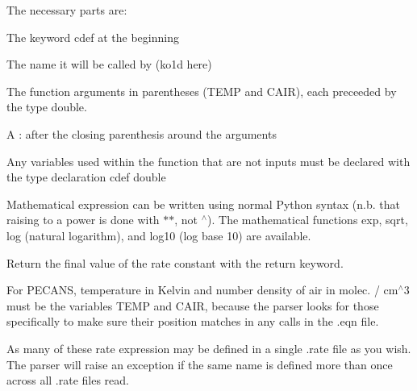 The necessary parts are\+:
\begin{DoxyItemize}
\item The keyword {\ttfamily cdef} at the beginning
\item The name it will be called by ({\ttfamily ko1d} here)
\item The function arguments in parentheses ({\ttfamily T\+E\+MP} and {\ttfamily C\+A\+IR}), each preceeded by the type {\ttfamily double}.
\item A {\ttfamily \+:} after the closing parenthesis around the arguments
\item Any variables used within the function that are not inputs must be declared with the type declaration {\ttfamily cdef double}
\item Mathematical expression can be written using normal Python syntax (n.\+b. that raising to a power is done with {\ttfamily $\ast$$\ast$}, not {\ttfamily $^\wedge$}). The mathematical functions {\ttfamily exp}, {\ttfamily sqrt}, {\ttfamily log} (natural logarithm), and {\ttfamily log10} (log base 10) are available.
\item Return the final value of the rate constant with the {\ttfamily return} keyword.
\item For P\+E\+C\+A\+NS, temperature in Kelvin and number density of air in molec. / cm$^\wedge$3 must be the variables T\+E\+MP and C\+A\+IR, because the parser looks for those specifically to make sure their position matches in any calls in the {\ttfamily .eqn} file.
\end{DoxyItemize}

As many of these rate expression may be defined in a single {\ttfamily .rate} file as you wish. The parser will raise an exception if the same name is defined more than once across all {\ttfamily .rate} files read. 